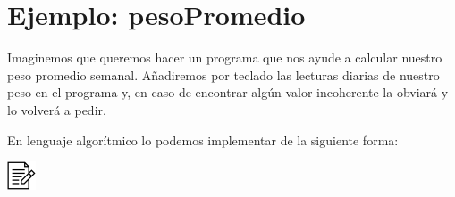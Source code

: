 \documentclass[
]{book}
\begin{document}
\hypertarget{ejemplo-pesopromedio}{%
\section{Ejemplo: pesoPromedio}\label{ejemplo-pesopromedio}}

Imaginemos que queremos hacer un programa que nos ayude a calcular nuestro peso promedio semanal. Añadiremos por teclado las lecturas diarias de nuestro peso en el programa y, en caso de encontrar algún valor incoherente la obviará y lo volverá a pedir.

En lenguaje algorítmico lo podemos implementar de la siguiente forma:

\includegraphics{./img/alg.png}
\end{document}
